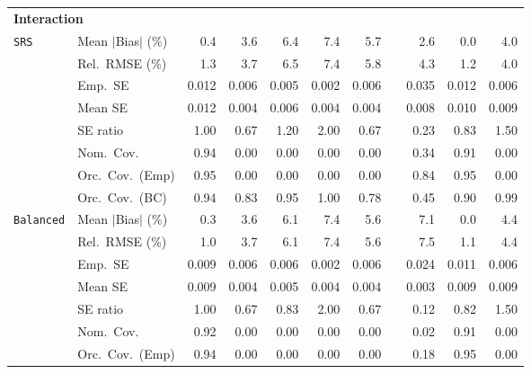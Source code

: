 \begin{landscape}
\begin{longtable}{llrrrrrrrrr}
\multicolumn{11}{l}{\textbf{Interaction}} \\
\addlinespace[2pt]
\quad \texttt{SRS} & Mean $|$Bias$|$ (\%) & \cellcolor{ranktwo}0.4 & 3.6 & 6.4 & 7.4 & 5.7 &  & \cellcolor{rankthree}2.6 & \cellcolor{rankone}0.0 & 4.0 \\
 & Rel.\ RMSE (\%) & \cellcolor{ranktwo}1.3 & \cellcolor{rankthree}3.7 & 6.5 & 7.4 & 5.8 &  & 4.3 & \cellcolor{rankone}1.2 & 4.0 \\
 & Emp.\ SE & 0.012 & 0.006 & 0.005 & 0.002 & 0.006 &  & 0.035 & 0.012 & 0.006 \\
 & Mean SE & 0.012 & 0.004 & 0.006 & 0.004 & 0.004 &  & 0.008 & 0.010 & 0.009 \\
 & SE ratio & \cellcolor{rankone}1.00 & 0.67 & \cellcolor{rankthree}1.20 & 2.00 & 0.67 &  & 0.23 & \cellcolor{ranktwo}0.83 & 1.50 \\
 & Nom.\ Cov. & \cellcolor{rankone}0.94 & 0.00 & 0.00 & 0.00 & 0.00 &  & \cellcolor{rankthree}0.34 & \cellcolor{ranktwo}0.91 & 0.00 \\
 & Orc.\ Cov.\ (Emp) & \cellcolor{rankone}0.95 & \cellcolor{rankthree}0.00 & \cellcolor{rankthree}0.00 & \cellcolor{rankthree}0.00 & \cellcolor{rankthree}0.00 &  & \cellcolor{ranktwo}0.84 & \cellcolor{rankone}0.95 & \cellcolor{rankthree}0.00 \\
 & Orc.\ Cov.\ (BC) & \cellcolor{ranktwo}0.94 & 0.83 & \cellcolor{rankone}0.95 & 1.00 & 0.78 &  & 0.45 & 0.90 & \cellcolor{rankthree}0.99 \\
\addlinespace[2pt]
\quad \texttt{Balanced} & Mean $|$Bias$|$ (\%) & \cellcolor{ranktwo}0.3 & \cellcolor{rankthree}3.6 & 6.1 & 7.4 & 5.6 &  & 7.1 & \cellcolor{rankone}0.0 & 4.4 \\
 & Rel.\ RMSE (\%) & \cellcolor{rankone}1.0 & \cellcolor{rankthree}3.7 & 6.1 & 7.4 & 5.6 &  & 7.5 & \cellcolor{ranktwo}1.1 & 4.4 \\
 & Emp.\ SE & 0.009 & 0.006 & 0.006 & 0.002 & 0.006 &  & 0.024 & 0.011 & 0.006 \\
 & Mean SE & 0.009 & 0.004 & 0.005 & 0.004 & 0.004 &  & 0.003 & 0.009 & 0.009 \\
 & SE ratio & \cellcolor{rankone}1.00 & 0.67 & \cellcolor{ranktwo}0.83 & 2.00 & 0.67 &  & 0.12 & \cellcolor{rankthree}0.82 & 1.50 \\
 & Nom.\ Cov. & \cellcolor{rankone}0.92 & 0.00 & 0.00 & 0.00 & 0.00 &  & \cellcolor{rankthree}0.02 & \cellcolor{ranktwo}0.91 & 0.00 \\
 & Orc.\ Cov.\ (Emp) & \cellcolor{ranktwo}0.94 & 0.00 & 0.00 & 0.00 & 0.00 &  & \cellcolor{rankthree}0.18 & \cellcolor{rankone}0.95 & 0.00 \\

\end{longtable}
\end{landscape}
